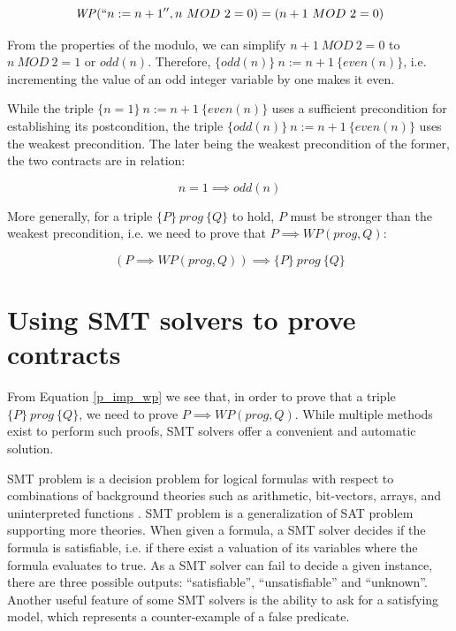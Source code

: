 \documentclass{kththesis}
\newcommand{\htriple}[3]{\ensuremath{\{#1\}~#2~\{#3\}}}
\newcommand{\WP}{\ensuremath{\mathit{WP}}}
\begin{document}
{\begin{equation}
  \WP(``n:=n+1'',n~MOD~2 = 0)=(n+1~MOD~2 = 0)
  \label{wp_comp_n_inc_even}
\end{equation}

From the properties of the modulo, we can simplify $n+1~MOD~2 = 0$ to $n~MOD~2 = 1$ or $odd(n)$. Therefore, \htriple{odd(n)}{n:=n+1}{even(n)}, i.e. incrementing the value of an odd integer variable by one makes it even.

While the triple \htriple{n=1}{n:=n+1}{even(n)} uses a sufficient precondition for establishing its postcondition, the triple \htriple{odd(n)}{n:=n+1}{even(n)} uses the weakest precondition. The later being the weakest precondition of the former, the two contracts are in relation:

\begin{equation}
  n=1 \implies odd(n)
\end{equation}

More generally, for a triple \htriple{P}{prog}{Q} to hold, $P$ must be stronger than the weakest precondition, i.e. we need to prove that $P \implies \WP(prog, Q)$:


\begin{equation}
  (P \implies \WP(prog, Q)) \implies \htriple{P}{prog}{Q}
  \label{p_imp_wp}
\end{equation}

\section{Using SMT solvers to prove contracts} \label{using-smt-to-prove-contracts}

From Equation \ref{p_imp_wp} we see that, in order to prove that a triple \htriple{P}{prog}{Q}, we need to prove $P \implies \WP(prog, Q)$. While multiple methods exist to perform such proofs, \acrshort{SMT} solvers offer a convenient and automatic solution.

\acrfull{SMT} problem is a decision problem for logical formulas with respect to combinations of background theories such as arithmetic, bit-vectors, arrays, and uninterpreted functions \cite{nikolaj_bjorner_programming_2019}. \gls{SMT} problem is a generalization of \gls{SAT} problem supporting more theories. When given a formula, a \gls{SMT} solver decides if the formula is satisfiable, i.e. if there exist a valuation of its variables where the formula evaluates to true. As a \gls{SMT} solver can fail to decide a given instance, there are three possible outputs: ``satisfiable'', ``unsatisfiable'' and ``unknown''. Another useful feature of some \gls{SMT} solvers is the ability to ask for a satisfying model, which represents a counter-example of a false predicate.

}
\end{document}
